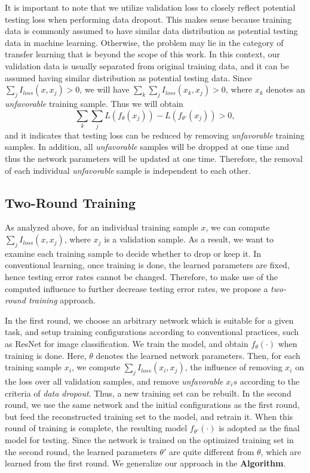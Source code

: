 \documentclass[10pt, conference, letterpaper]{IEEEtran}
\begin{document}
It is important to note that we utilize validation loss to closely reflect potential testing loss when performing data dropout. This makes sense because training data is commonly assumed to have similar data distribution as potential testing data in machine learning. Otherwise, the problem may lie in the category of transfer learning \cite{pan2010survey} that is beyond the scope of this work. In this context, our validation data is usually separated from original training data, and it can be assumed having similar distribution as potential testing data. Since $\sum_{j}I_{loss}(x, x_{j})>0$, we will have $\sum_{k}\sum_{j}I_{loss}(x_{k}, x_{j})>0$, where $x_{k}$ denotes an \emph{unfavorable} training sample. Thus we will obtain 
\begin{equation}
  \sum_{k}\sum_{j} L(f_{\theta}(x_{j}))-L(f_{\theta'}(x_{j}))>0, 
\end{equation}
and it indicates that testing loss can be reduced by removing \emph{unfavorable} training samples. In addition, all \emph{unfavorable} samples will be dropped at one time and thus the network parameters will be updated at one time. Therefore, the removal of each individual \emph{unfavorable} sample is independent to each other. 

\subsection{Two-Round Training}
\label{tr-train}
As analyzed above, for an individual training sample $x$, we can compute $\sum_{j}I_{loss}(x, x_{j})$, where $x_j$ is a validation sample. As a result, we want to examine each training sample to decide whether to drop or keep it. In conventional learning, once training is done, the learned parameters are fixed, hence testing error rates cannot be changed. Therefore, to make use of the computed influence to further decrease testing error rates, we propose a \emph{two-round training} approach.

In the first round, we choose an arbitrary network which is suitable for a given task, and setup training configurations according to conventional practices, such as ResNet \cite{he2016deep} for image classification. We train the model, and obtain $f_{\theta}(\cdot)$ when training is done. Here, $\theta$ denotes the learned network parameters. Then, for each training sample $x_{i}$, we compute $\sum_{j}I_{loss}(x_{i}, x_{j})$, the influence of removing $x_{i}$ on the loss over all validation samples, and remove \emph{unfavorable} $x_{i}s$ according to the criteria of \emph{data dropout}. Thus, a new training set can be rebuilt. In the second round, we use the same network and the initial configurations as the first round, but feed the reconstructed training set to the model, and retrain it. When this round of training is complete, the resulting model $f_{\theta'}(\cdot)$ is adopted as the final model for testing. Since the network is trained on the optimized training set in the second round, the learned parameters $\theta'$ are quite different from $\theta$, which are learned from the first round. We generalize our approach in the \textbf{Algorithm}.
\end{document}

